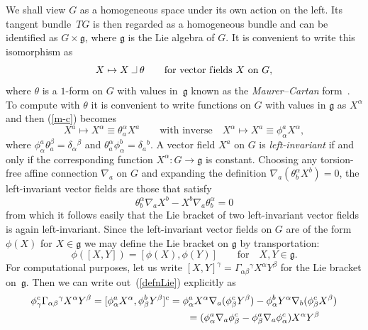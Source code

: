 \documentclass[11pt]{article}
\newcommand{\intprod}{\;\rule{5pt}{.3pt}\rule{.3pt}{7pt}\;}
\begin{document}
We shall view $G$ as a homogeneous space under its own action on the left. Its
tangent bundle~$TG$ is then regarded as a homogeneous bundle and can be
identif\/ied as $G\times{\mathfrak{g}}$, where ${\mathfrak{g}}$ is the Lie
algebra of $G$. It is convenient to write this isomorphism as
\begin{equation}\label{m-c}
X\mapsto X\intprod\theta \qquad\mbox{for vector f\/ields $X$ on $G$},
\end{equation}
where $\theta$ is a $1$-form on $G$ with values in~${\mathfrak{g}}$ known as
the {\em Maurer--Cartan\/} form~\cite{ss}. To compute with $\theta$ it is
convenient to write functions on $G$ with values in ${\mathfrak{g}}$ as
$X^\alpha$ and then (\ref{m-c}) becomes
\[
X^a\mapsto X^\alpha\equiv\theta_a^\alpha X^a\qquad \mbox{with inverse}
\quad X^\alpha\mapsto X^a\equiv\phi_\alpha^a X^\alpha,
\]
where $\phi_\alpha^a\theta^\beta_a=\delta_\alpha{}^\beta$ and $\theta_a^\alpha\phi_\alpha^b=\delta_a{}^b$.
A vector f\/ield $X^a$ on $G$ is {\em left-invariant\/} if and only if the
corresponding function $X^\alpha:G\to{\mathfrak{g}}$ is constant. Choosing any
torsion-free af\/f\/ine connection $\nabla_a$ on $G$ and expanding the def\/inition
$\nabla_a(\theta_b^\alpha X^b)=0$, the left-invariant vector f\/ields are those
that satisfy
\[\theta_b^\alpha \nabla_aX^b-X^b \nabla_a\theta_b^\alpha=0\]
from which it follows easily that the Lie bracket of two left-invariant
vector f\/ields is again left-invariant.
Since the left-invariant vector f\/ields on $G$ are of the form $\phi(X)$ for
$X\in{\mathfrak{g}}$ we may def\/ine the Lie bracket
on ${\mathfrak{g}}$ by transportation: %
\begin{equation}\label{defnLie}
\phi([X,Y])=[\phi(X),\phi(Y)]\qquad\mbox{for} \quad X,Y\in{\mathfrak{g}}.
\end{equation}
For computational purposes, let us write
$[X,Y]^\gamma=\Gamma_{\alpha\beta}{}^\gamma X^\alpha Y^\beta$ for the Lie
bracket on~${\mathfrak{g}}$. Then we can write out~(\ref{defnLie}) explicitly
as
 \begin{gather*}
\phi_\gamma^c\Gamma_{\alpha\beta}{}^\gamma X^\alpha Y^\beta =
[\phi_\alpha^a X^\alpha,\phi_\beta^b Y^\beta]^c
 = \phi_\alpha^a X^\alpha \nabla_a(\phi_\beta^c Y^\beta)-
\phi_\alpha^b Y^\alpha \nabla_b(\phi_\beta^c X^\beta)\\
\hphantom{\phi_\gamma^c\Gamma_{\alpha\beta}{}^\gamma X^\alpha Y^\beta =
[\phi_\alpha^a X^\alpha,\phi_\beta^b Y^\beta]^c}{}
 = (\phi_\alpha^a \nabla_a\phi_\beta^c-\phi_\beta^a \nabla_a\phi_\alpha^c)
X^\alpha Y^\beta
\end{gather*}
\end{document}
